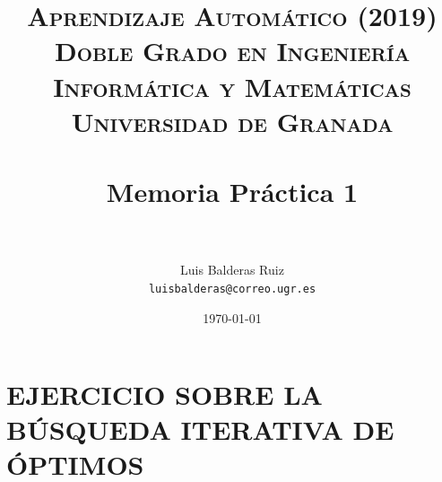 
\graphicspath{ {./images/} }
\usepackage{subcaption}
\usepackage{hyperref}
\usepackage{soul}


\title{	
\normalfont \normalsize 
\textsc{\textbf{Aprendizaje Automático (2019)} \\ Doble Grado en Ingeniería Informática y Matemáticas \\ Universidad de Granada} \\ [25pt] %
\horrule{0.5pt} \\[0.4cm] %
\huge Memoria Práctica 1 \\ %
\horrule{2pt} \\[0.5cm] %
}

\author{Luis Balderas Ruiz \\ \texttt{luisbalderas@correo.ugr.es}} 


\date{\normalsize\today} %




\maketitle %

\newpage %

\tableofcontents %

\listoffigures

\listoftables

\newpage



\section{EJERCICIO SOBRE LA BÚSQUEDA ITERATIVA DE ÓPTIMOS}

